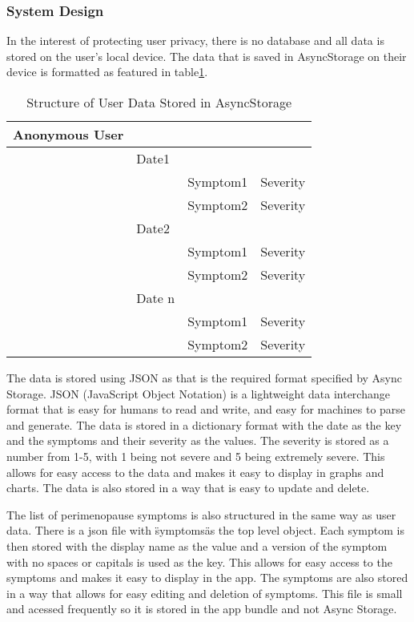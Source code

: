 \subsubsection{System Design}
In the interest of protecting user privacy, there is no database and all data is stored on the user's local device. The data that is saved in AsyncStorage on their device is formatted as featured in table\ref{table:user-data}. 

\begin{table}[h!!]
    \caption{Structure of User Data Stored in AsyncStorage}
    \label{table:user-data}
    \begin{tabular}{llll}
    \hline
    Anonymous User &        &          &          \\ \hline
                  & Date1  &          &          \\
                  &        & Symptom1 & Severity \\
                  &        & Symptom2 & Severity \\
                  & Date2  &          &          \\
                  &        & Symptom1 & Severity \\
                  &        & Symptom2 & Severity \\
                  & Date n &          &          \\
                  &        & Symptom1 & Severity \\
                  &        & Symptom2 & Severity \\ \hline
  \end{tabular}
\end{table}

The data is stored using JSON as that is the required format specified by Async Storage. JSON (JavaScript Object Notation) is a lightweight data interchange format that is easy for humans to read and write, and easy for machines to parse and generate\cite{JSON2025}. The data is stored in a dictionary format with the date as the key and the symptoms and their severity as the values. The severity is stored as a number from 1-5, with 1 being not severe and 5 being extremely severe. This allows for easy access to the data and makes it easy to display in graphs and charts. The data is also stored in a way that is easy to update and delete.

The list of perimenopause symptoms is also structured in the same way as user data. There is a json file with \"symptoms\" as the top level object. Each symptom is then stored with the display name as the value and a version of the symptom with no spaces or capitals is used as the key. This allows for easy access to the symptoms and makes it easy to display in the app. The symptoms are also stored in a way that allows for easy editing and deletion of symptoms. This file is small and acessed frequently so it is stored in the app bundle and not Async Storage.

